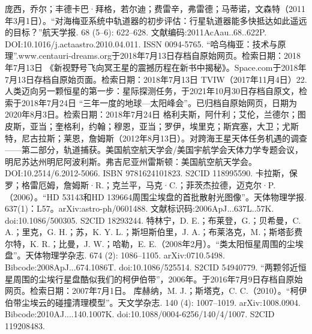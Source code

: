 \begin{enumerate}
 庞西，乔尔；丰德卡巴·拜格，若尔迪；费雷辛，弗雷德；马蒂诺，文森特（2011年3月1日）。“对海梅亚系统中轨道器的初步评估：行星轨道器能多快抵达如此遥远的目标？”航天学报. 68 (5–6): 622–628. 文献编码:2011AcAau..68..622P. DOI:10.1016/j.actaastro.2010.04.011. ISSN 0094-5765.
 “哈乌梅亚：技术与原理”.www.centauri-dreams.org于2018年7月13日存档自原始网页。检索日期：2018年7月13日
 《新视野号飞向冥王星的震撼历程在新书中揭秘》。Space.com于2018年7月13日存档自原始页面。检索日期：2018年7月13日
 TVIW（2017年11月4日）22. 人类迈向另一颗恒星的第一步：星际探测任务，于2021年10月30日存档自原文，检索于2018年7月24日
 “三年一度的地球—太阳峰会”。已归档自原始网页，日期为2020年8月3日。检索日期：2018年7月24日
 格利夫斯，阿什利；艾伦，兰德尔；图皮斯，亚当；奎格利，约翰；穆恩，亚当；罗伊，埃里克；斯宾塞，大卫；尤斯特，尼古拉斯；莱恩，詹姆斯（2012年8月13日）。对跨海王星天体任务机遇的调查——第二部分，轨道捕获。美国航空航天学会/美国宇航学会天体力学专题会议，明尼苏达州明尼阿波利斯。弗吉尼亚州雷斯顿：美国航空航天学会。DOI:10.2514/6.2012-5066. ISBN 9781624101823. S2CID 118995590.
 卡拉斯，保罗；格雷厄姆，詹姆斯·R.；克兰平，马克·C.；菲茨杰拉德，迈克尔·P.（2006）。“HD 53143和HD 139664周围尘埃盘的首批散射光图像”。天体物理学报. 637(1)：L57。arXiv:astro-ph/0601488. 文献标识码:2006ApJ...637L..57K. doi:10.1086/500305. S2CID 18293244.
 特林宁，D. E.；布莱登，G.；贝希曼，C. A.；里克，G. H.；苏，K. Y. L.；斯坦斯伯里，J. A.；布莱洛克，M.；斯塔彭费尔特，K. R.；比曼，J. W.；哈勒，E. E.（2008年2月）。“类太阳恒星周围的尘埃盘”。天体物理学杂志. 674 (2): 1086–1105. arXiv:0710.5498. Bibcode:2008ApJ...674.1086T. doi:10.1086/525514. S2CID 54940779.
 “两颗邻近恒星周围的尘埃行星盘酷似我们的柯伊伯带”，2006年。于2016年7月9日存档自原始网页。检索日期：2007年7月1日。
 库赫纳，M. J.；斯塔克，C. C.（2010）。“柯伊伯带尘埃云的碰撞清理模型”。天文学杂志. 140 (4): 1007–1019. arXiv:1008.0904. Bibcode:2010AJ....140.1007K. doi:10.1088/0004-6256/140/4/1007. S2CID 119208483.
\end{enumerate}